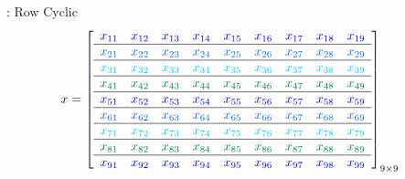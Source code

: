 \begin{frame}
\begin{exampleblock}{: Row Cyclic}
\begin{align*}
x &= \left[
      \begin{array}{lllllllll}
      \color{g11}x_{11} & \color{g11}x_{12} & \color{g11}x_{13} & 
\color{g11}x_{14} & \color{g11}x_{15} & \color{g11}x_{16} & \color{g11}x_{17} & 
\color{g11}x_{18} & \color{g11}x_{19}\\\hline
      \color{g12}x_{21} & \color{g12}x_{22} & \color{g12}x_{23} & 
\color{g12}x_{24} & \color{g12}x_{25} & \color{g12}x_{26} & \color{g12}x_{27} & 
\color{g12}x_{28} & \color{g12}x_{29}\\\hline
      \color{g13}x_{31} & \color{g13}x_{32} & \color{g13}x_{33} & 
\color{g13}x_{34} & \color{g13}x_{35} & \color{g13}x_{36} & \color{g13}x_{37} & 
\color{g13}x_{38} & \color{g13}x_{39}\\\hline
      \color{g21}x_{41} & \color{g21}x_{42} & \color{g21}x_{43} & 
\color{g21}x_{44} & \color{g21}x_{45} & \color{g21}x_{46} & \color{g21}x_{47} & 
\color{g21}x_{48} & \color{g21}x_{49}\\\hline
      \color{g11}x_{51} & \color{g11}x_{52} & \color{g11}x_{53} & 
\color{g11}x_{54} & \color{g11}x_{55} & \color{g11}x_{56} & \color{g11}x_{57} & 
\color{g11}x_{58} & \color{g11}x_{59}\\\hline
      \color{g12}x_{61} & \color{g12}x_{62} & \color{g12}x_{63} & 
\color{g12}x_{64} & \color{g12}x_{65} & \color{g12}x_{66} & \color{g12}x_{67} & 
\color{g12}x_{68} & \color{g12}x_{69}\\\hline
      \color{g13}x_{71} & \color{g13}x_{72} & \color{g13}x_{73} & 
\color{g13}x_{74} & \color{g13}x_{75} & \color{g13}x_{76} & \color{g13}x_{77} & 
\color{g13}x_{78} & \color{g13}x_{79}\\\hline
      \color{g21}x_{81} & \color{g21}x_{82} & \color{g21}x_{83} & 
\color{g21}x_{84} & \color{g21}x_{85} & \color{g21}x_{86} & \color{g21}x_{87} & 
\color{g21}x_{88} & \color{g21}x_{89}\\\hline
      \color{g11}x_{91} & \color{g11}x_{92} & \color{g11}x_{93} & 
\color{g11}x_{94} & \color{g11}x_{95} & \color{g11}x_{96} & \color{g11}x_{97} & 
\color{g11}x_{98} & \color{g11}x_{99}\\
      \end{array}
\right]_{9\times 9}
\end{align*}
\vspace{-.6cm}
\begin{align*}

\end{align*}
\end{exampleblock}
\end{frame}
